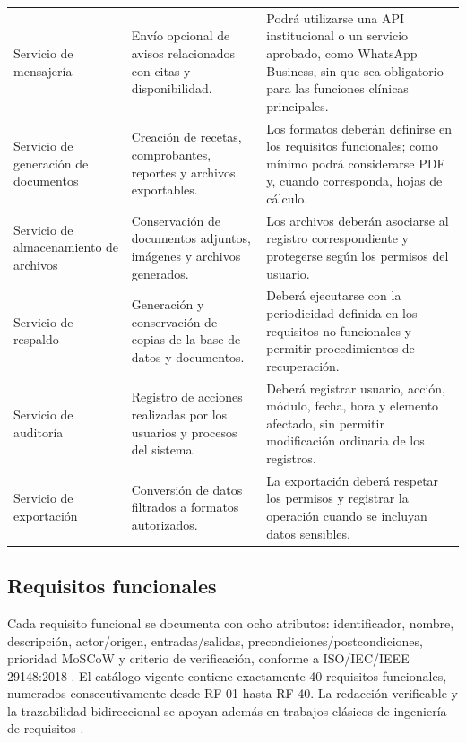 \documentclass[11pt,a4paper]{article}
\begin{document}
\begin{longtable}{p{} p{} p{}}
		Servicio de mensajería &
		Envío opcional de avisos relacionados con citas y disponibilidad. &
		Podrá utilizarse una API institucional o un servicio aprobado, como WhatsApp
		Business, sin que sea obligatorio para las funciones clínicas principales. \\
		
		Servicio de generación de documentos &
		Creación de recetas, comprobantes, reportes y archivos exportables. &
		Los formatos deberán definirse en los requisitos funcionales; como mínimo podrá
		considerarse PDF y, cuando corresponda, hojas de cálculo. \\
		
		Servicio de almacenamiento de archivos &
		Conservación de documentos adjuntos, imágenes y archivos generados. &
		Los archivos deberán asociarse al registro correspondiente y protegerse según
		los permisos del usuario. \\
		
		Servicio de respaldo &
		Generación y conservación de copias de la base de datos y documentos. &
		Deberá ejecutarse con la periodicidad definida en los requisitos no funcionales
		y permitir procedimientos de recuperación. \\
		
		Servicio de auditoría &
		Registro de acciones realizadas por los usuarios y procesos del sistema. &
		Deberá registrar usuario, acción, módulo, fecha, hora y elemento afectado, sin
		permitir modificación ordinaria de los registros. \\
		
		Servicio de exportación &
		Conversión de datos filtrados a formatos autorizados. &
		La exportación deberá respetar los permisos y registrar la operación cuando se
		incluyan datos sensibles. \\
		
	\end{longtable}
	
	\subsection{ Requisitos funcionales}
	
	Cada requisito funcional se documenta con ocho atributos: identificador, nombre, descripción, actor/origen, entradas/salidas, precondiciones/postcondiciones, prioridad MoSCoW y criterio de verificación, conforme a ISO/IEC/IEEE 29148:2018 \cite{iso29148}. El catálogo vigente contiene exactamente 40 requisitos funcionales, numerados consecutivamente desde RF-01 hasta RF-40. La redacción verificable y la trazabilidad bidireccional se apoyan además en trabajos clásicos de ingeniería de requisitos \cite{nuseibeh2000,davis1993,gotel1994,ramesh2001,clelandhuang2003}.
	
\end{document}
